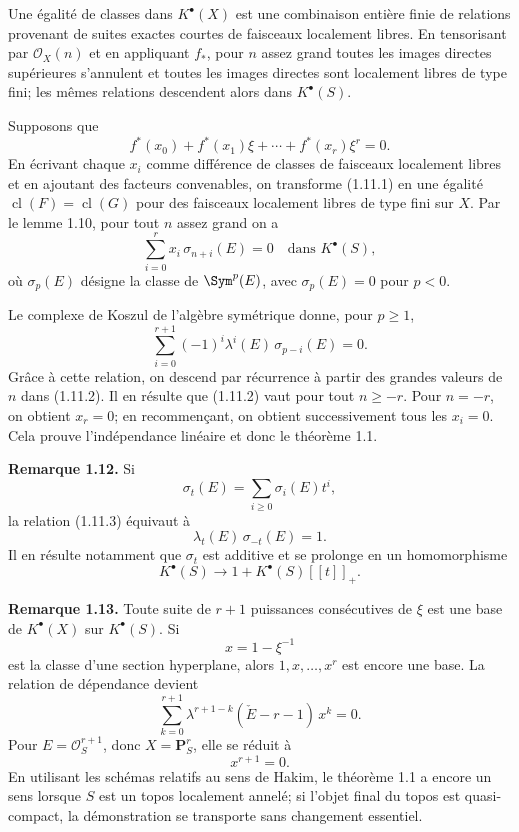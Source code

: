 \documentclass[11pt]{article}
\newcommand{\cl}{\operatorname{cl}}
\begin{document}
Une égalité de classes dans \(K^\bullet(X)\) est une combinaison entière finie de relations provenant de suites exactes courtes de faisceaux localement libres. En tensorisant par \(\mathcal O_X(n)\) et en appliquant \(f_*\), pour \(n\) assez grand toutes les images directes supérieures s'annulent et toutes les images directes sont localement libres de type fini; les mêmes relations descendent alors dans \(K^\bullet(S)\).

Supposons que
\begin{equation}\tag{1.11.1}
  f^*(x_0)+f^*(x_1)\xi+\cdots+f^*(x_r)\xi^r=0 .
\end{equation}
En écrivant chaque \(x_i\) comme différence de classes de faisceaux localement libres et en ajoutant des facteurs convenables, on transforme (1.11.1) en une égalité \(\cl(F)=\cl(G)\) pour des faisceaux localement libres de type fini sur \(X\). Par le lemme 1.10, pour tout \(n\) assez grand on a
\begin{equation}\tag{1.11.2}
  \sum_{i=0}^{r} x_i\,\sigma_{n+i}(E)=0
  \quad\text{dans }K^\bullet(S),
\end{equation}
où \(\sigma_p(E)\) désigne la classe de \(\Sym^p(E)\), avec \(\sigma_p(E)=0\) pour \(p<0\).

Le complexe de Koszul de l'algèbre symétrique donne, pour \(p\geq1\),
\begin{equation}\tag{1.11.3}
  \sum_{i=0}^{r+1}(-1)^i\lambda^i(E)\,\sigma_{p-i}(E)=0 .
\end{equation}
Grâce à cette relation, on descend par récurrence à partir des grandes valeurs de \(n\) dans (1.11.2). Il en résulte que (1.11.2) vaut pour tout \(n\geq -r\). Pour \(n=-r\), on obtient \(x_r=0\); en recommençant, on obtient successivement tous les \(x_i=0\). Cela prouve l'indépendance linéaire et donc le théorème 1.1.

\textbf{Remarque 1.12.} Si
\[
  \sigma_t(E)=\sum_{i\geq0}\sigma_i(E)t^i,
\]
la relation (1.11.3) équivaut à
\[
  \lambda_t(E)\,\sigma_{-t}(E)=1.
\]
Il en résulte notamment que \(\sigma_t\) est additive et se prolonge en un homomorphisme
\[
  K^\bullet(S)\longrightarrow 1+K^\bullet(S)[[t]]_+ .
\]

\textbf{Remarque 1.13.} Toute suite de \(r+1\) puissances consécutives de \(\xi\) est une base de \(K^\bullet(X)\) sur \(K^\bullet(S)\). Si
\[
  x=1-\xi^{-1}
\]
est la classe d'une section hyperplane, alors \(1,x,\ldots,x^r\) est encore une base. La relation de dépendance devient
\begin{equation}\tag{1.13.1}
  \sum_{k=0}^{r+1}\lambda^{r+1-k}(\check E-r-1)\,x^k=0.
\end{equation}
Pour \(E=\mathcal O_S^{r+1}\), donc \(X=\mathbf P^r_S\), elle se réduit à
\[
  x^{r+1}=0.
\]
En utilisant les schémas relatifs au sens de Hakim, le théorème 1.1 a encore un sens lorsque \(S\) est un topos localement annelé; si l'objet final du topos est quasi-compact, la démonstration se transporte sans changement essentiel.
\end{document}
